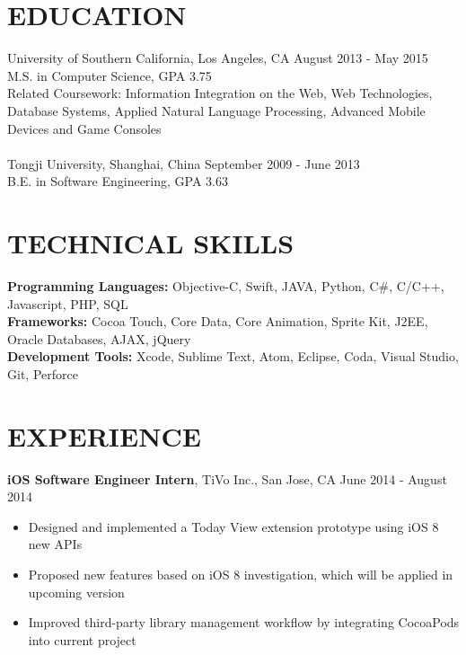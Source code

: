 \documentclass[line, overlapped]{res}
\begin{document}
\address{1133 W 36th Pl Apt 6, Los Angeles, CA 90007}
\address{(213) 806-0803, haishany@usc.edu, gitub.com/gabrielyeah, linkedin.com/in/haishanye}

\begin{resume}

\section{EDUCATION}
University of Southern California, Los Angeles, CA \hfill August 2013 - May 2015\\
M.S. in Computer Science, GPA 3.75\\
Related Coursework: Information Integration on the Web, Web Technologies, Database Systems, Applied Natural Language Processing,
Advanced Mobile Devices and Game Consoles\\
\\
Tongji University, Shanghai, China \hfill September 2009 - June 2013\\
B.E. in Software Engineering, GPA 3.63

\section{TECHNICAL SKILLS}
\textbf{Programming Languages:} Objective-C, Swift, JAVA, Python, C\#, C/C++, Javascript, PHP, SQL\\
\textbf{Frameworks:} Cocoa Touch, Core Data, Core Animation, Sprite Kit, J2EE, Oracle Databases, AJAX, jQuery\\
\textbf{Development Tools:} Xcode, Sublime Text, Atom, Eclipse, Coda, Visual Studio, Git, Perforce

\section{EXPERIENCE}

\textbf{iOS Software Engineer Intern}, TiVo Inc., San Jose, CA \hfill June 2014 - August 2014
 \begin{itemize} \itemsep -2pt
 
 \item Designed and implemented a Today View extension prototype using iOS 8 new APIs
 
 \item Proposed new features based on iOS 8 investigation, which will be applied in upcoming version
 
 \item Improved third-party library management workflow by integrating CocoaPods into current project
 

\end{itemize}
\end{resume}
\end{document}

